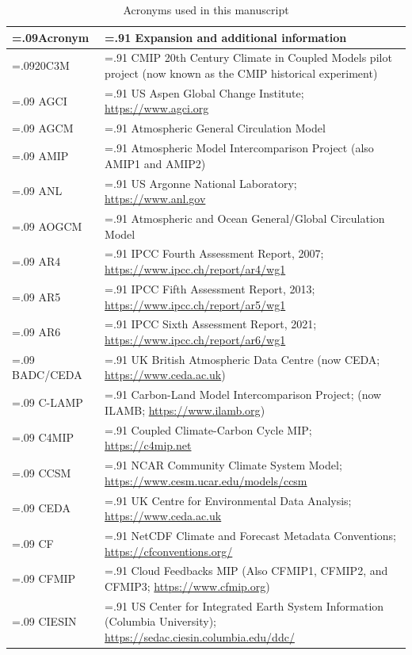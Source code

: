 \documentclass[manuscript]{copernicus}
\begin{document}
\begin{table}[htp]
\renewcommand{\arraystretch}{2}
\scriptsize
\centering
\caption{Acronyms used in this manuscript}
\resizebox{\textwidth}{!} {
	\begin{tabularx}{1\textwidth} { 
	  | >{\raggedright\arraybackslash\hsize=.09\hsize}X
	  | >{\centering\arraybackslash\hsize=.91\hsize}X | }
\hline
\textbf{Acronym} & \textbf{Expansion and additional information}\\ \hline
20C3M & CMIP 20th Century Climate in Coupled Models pilot project (now known as the CMIP historical experiment)\\ \hline
AGCI & US Aspen Global Change Institute; \url{https://www.agci.org}\\ \hline
AGCM & Atmospheric General Circulation Model\\ \hline
AMIP & Atmospheric Model Intercomparison Project (also AMIP1 and AMIP2)\\ \hline
ANL & US Argonne National Laboratory; \url{https://www.anl.gov}\\ \hline
AOGCM & Atmospheric and Ocean General/Global Circulation Model\\ \hline
AR4 & IPCC Fourth Assessment Report, 2007; \url{https://www.ipcc.ch/report/ar4/wg1}\\ \hline
AR5 & IPCC Fifth Assessment Report, 2013; \url{https://www.ipcc.ch/report/ar5/wg1}\\ \hline
AR6 & IPCC Sixth Assessment Report, 2021; \url{https://www.ipcc.ch/report/ar6/wg1}\\ \hline
BADC/CEDA & UK British Atmospheric Data Centre (now CEDA; \url{https://www.ceda.ac.uk})\\ \hline
C-LAMP & Carbon-Land Model Intercomparison Project; (now ILAMB; \url{https://www.ilamb.org})\\ \hline
C4MIP & Coupled Climate-Carbon Cycle MIP; \url{https://c4mip.net}\\ \hline
CCSM & NCAR Community Climate System Model; \url{https://www.cesm.ucar.edu/models/ccsm}\\ \hline
CEDA & UK Centre for Environmental Data Analysis; \url{https://www.ceda.ac.uk}\\ \hline
CF & NetCDF Climate and Forecast Metadata Conventions; \url{https://cfconventions.org/}\\ \hline
CFMIP & Cloud Feedbacks MIP (Also CFMIP1, CFMIP2, and CFMIP3; \url{https://www.cfmip.org})\\ \hline
CIESIN & US Center for Integrated Earth System Information (Columbia University); \url{https://sedac.ciesin.columbia.edu/ddc/}\\ \hline

\end{tabularx}}
\end{table}
\end{document}
